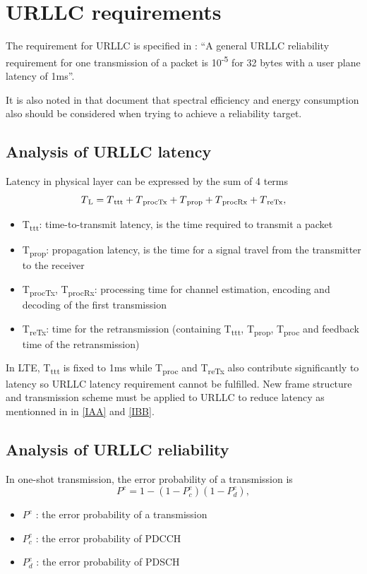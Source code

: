 \documentclass[conference]{IEEEtran}
\begin{document}
\section{URLLC requirements}
The requirement for URLLC is specified in \cite{b6}: ``A general URLLC reliability requirement for one transmission of a packet is 10\textsuperscript{-5} for 32 bytes with a user plane latency of 1ms''.

It is also noted in that document that spectral efficiency and energy consumption also should be considered when trying to achieve a reliability target. 
\subsection{Analysis of URLLC latency}
Latency in physical layer can be expressed by the sum of 4 terms \cite{ad1}
\begin{equation}
T\textsubscript{L}= T\textsubscript{ttt} + T\textsubscript{procTx} + T\textsubscript{prop} + T\textsubscript{procRx} + T\textsubscript{reTx},\label{eq1}
\end{equation}

\begin{itemize}
\item T\textsubscript{ttt}: time-to-transmit latency, is the time required to transmit a packet
\item T\textsubscript{prop}: propagation latency, is the time for a signal travel from the transmitter to the receiver
\item T\textsubscript{procTx}, T\textsubscript{procRx}: processing time for channel estimation, encoding and decoding of the first transmission
\item T\textsubscript{reTx}: time for the retransmission (containing T\textsubscript{ttt}, T\textsubscript{prop}, T\textsubscript{proc} and feedback time of the retransmission) 
\end{itemize}

In LTE, T\textsubscript{ttt} is fixed to 1ms while T\textsubscript{proc} and T\textsubscript{reTx} also contribute significantly to latency so URLLC latency requirement cannot be fulfilled. New frame structure and transmission scheme must be applied to URLLC to reduce latency as mentionned in in \ref{IAA} and \ref{IBB}.  
\subsection{Analysis of URLLC reliability}\label{IIBB}
In one-shot transmission, the error probability of a transmission is
\begin{equation}
P^{e} = 1 - (1 - P^{e}_{c})(1 - P^{e}_{d}),\label{eq2}
\end{equation}
\begin{itemize}
    \item $P^{e}$ : the error probability of a transmission
    \item $P^{e}_{c}$ : the error probability of PDCCH 
    \item $P^{e}_{d}$ : the error probability of PDSCH
\end{itemize}
\end{document}
